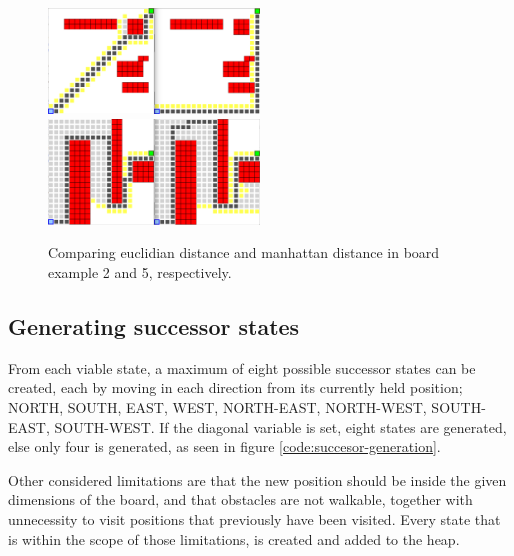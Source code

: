 \begin{figure}[h!]
	\centering
	\begin{minipage}{\textwidth}
		\includegraphics[width=0.5\textwidth]{module_1/images/run_ex2}
		\includegraphics[width=0.5\textwidth]{module_1/images/run_ex5}
	\end{minipage}
	\caption{Comparing euclidian distance and manhattan distance in board example 2 and 5, respectively.}
	\label{run:examples}
\end{figure}

\subsection{Generating successor states}
From each viable state, a maximum of eight possible successor states can be created, each by moving in each direction from its currently held position; NORTH, SOUTH, EAST, WEST, NORTH-EAST, NORTH-WEST, SOUTH-EAST, SOUTH-WEST. If the diagonal variable is set, eight states are generated, else only four is generated, as seen in figure \ref{code:succesor-generation}.

Other considered limitations are that the new position should be inside the given dimensions of the board, and that obstacles are not walkable, together with unnecessity to visit positions that previously have been visited. Every state that is within the scope of those limitations, is created and added to the heap. 



